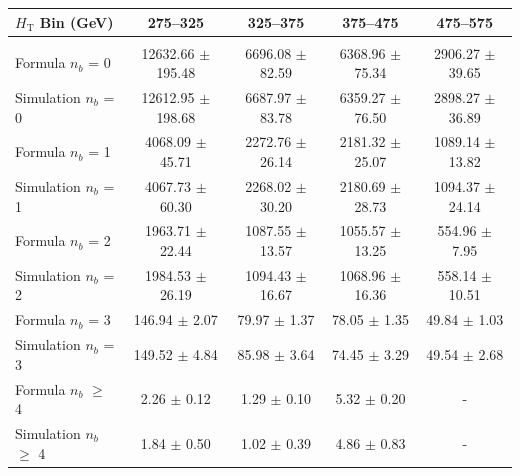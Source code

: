 \begin{table}[ht!]
\begin{center}
\footnotesize
\begin{tabular*}{0.95\textwidth}{@{\extracolsep{\fill}}lcccc}
\hline
$H_{\textrm{T}}$ Bin (GeV)         & 275--325                  & 325--375                  & 375--475                  & 475--575                 \\ 
\hline\hline
\\
Formula $n_{b}$ = 0                 & 12632.66  $\pm$  195.48   & 6696.08  $\pm$  82.59     & 6368.96  $\pm$  75.34     & 2906.27  $\pm$  39.65    \\
Simulation $n_{b}$ = 0                 & 12612.95  $\pm$  198.68   & 6687.97  $\pm$  83.78     & 6359.27  $\pm$  76.50     & 2898.27  $\pm$  36.89    \\
\hline
Formula $n_{b}$ = 1                 & 4068.09  $\pm$  45.71     & 2272.76  $\pm$  26.14     & 2181.32  $\pm$  25.07     & 1089.14  $\pm$  13.82    \\
Simulation $n_{b}$ = 1                 & 4067.73  $\pm$  60.30     & 2268.02  $\pm$  30.20     & 2180.69  $\pm$  28.73     & 1094.37  $\pm$  24.14    \\
\hline
Formula $n_{b}$ = 2                  & 1963.71  $\pm$  22.44     & 1087.55  $\pm$  13.57     & 1055.57  $\pm$  13.25     & 554.96  $\pm$  7.95      \\
Simulation $n_{b}$ = 2                  & 1984.53  $\pm$  26.19     & 1094.43  $\pm$  16.67     & 1068.96  $\pm$  16.36     & 558.14  $\pm$  10.51     \\
\hline
Formula $n_{b}$ = 3                  & 146.94  $\pm$  2.07       & 79.97  $\pm$  1.37        & 78.05  $\pm$  1.35        & 49.84  $\pm$  1.03       \\
Simulation $n_{b}$ = 3                  & 149.52  $\pm$  4.84       & 85.98  $\pm$  3.64        & 74.45  $\pm$  3.29        & 49.54  $\pm$  2.68       \\
\hline
Formula $n_{b}$ $\geq$ 4             & 2.26  $\pm$  0.12         & 1.29  $\pm$  0.10         & 5.32  $\pm$  0.20         & -     \\ 
Simulation $n_{b}$ $\geq$ 4             & 1.84  $\pm$  0.50         & 1.02  $\pm$  0.39         & 4.86  $\pm$  0.83       & -        \\ 


\end{tabular*}
\end{center}
\end{table}
